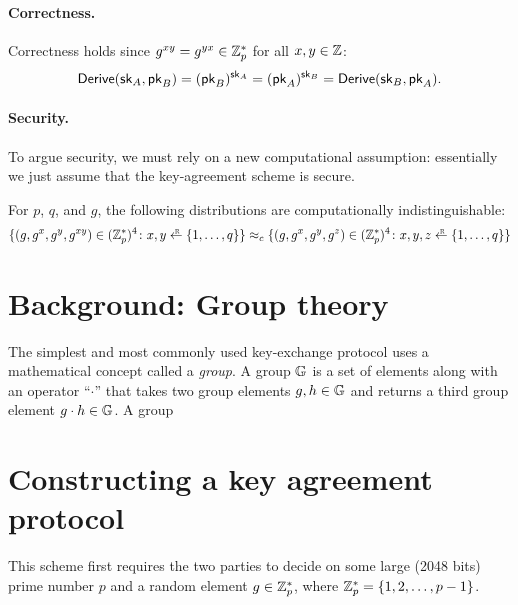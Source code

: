 \paragraph{Correctness.}
Correctness holds since $g^{xy}=g^{yx} \in \mathbb{Z}^*_p$ for all $x,y \in \mathbb{Z}$:
\begin{align*}
  \mathsf{Derive}({\mathsf{sk}}_A, \mathsf{pk}_B) = (\mathsf{pk}_B)^{{\mathsf{sk}}_A} = (\mathsf{pk}_A)^{{\mathsf{sk}}_B} = \mathsf{Derive}({\mathsf{sk}}_B, \mathsf{pk}_A).
\end{align*}


\paragraph{Security.}
To argue security, we must rely on a new computational assumption:
essentially we just assume that the key-agreement scheme is secure.

\begin{definition}
For $p$, $q$, and $g$, the following distributions are 
computationally indistinguishable:
  \[ 
  \{ (g, g^x, g^y, g^{xy}) \in (\Z^*_p)^4\colon x, y \getsr \{1, \dots, q\}\}
  \approx_c
  \{ (g, g^x, g^y, g^z) \in (\Z^*_p)^4 \colon x, y, z \getsr \{1, \dots, q\}\}
  \]
\end{definition}

\section{Background: Group theory}
The simplest and most commonly used key-exchange protocol uses
a mathematical concept called a \emph{group}.
A group $\mathbb{G}$ is a set of elements along with an operator
``$\cdot$'' that takes two group elements $g, h \in \mathbb{G}$
and returns a third group element $g \cdot h \in \mathbb{G}$.
A group 





\section{Constructing a key agreement protocol}

This scheme first requires the two parties to decide on some large (2048 bits) prime number $p$ and a random element $g \in \mathbb{Z}_p^*$, where $\mathbb{Z}_p^* = \left\{ 1, 2, \ldots, p-1 \right\}$. 

